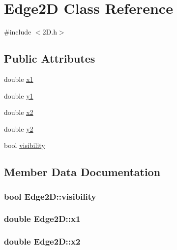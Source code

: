 \hypertarget{class_edge2_d}{}\section{Edge2D Class Reference}
\label{class_edge2_d}


{\ttfamily \#include $<$2\+D.\+h$>$}

\subsection*{Public Attributes}
\begin{DoxyCompactItemize}
\item 
double \hyperlink{class_edge2_d_a57d2011d8b0354061fee41fb14be62d1}{x1}
\item 
double \hyperlink{class_edge2_d_a0d93b3f558f7faa717389bd3208f5f67}{y1}
\item 
double \hyperlink{class_edge2_d_a853c4e716c4f158078d6ec0dcd926c2d}{x2}
\item 
double \hyperlink{class_edge2_d_a9d8863dcde07985fe52d9ed3a8d80b4d}{y2}
\item 
bool \hyperlink{class_edge2_d_a3ab762524c7e0dc8b77beb80a3711544}{visibility}
\end{DoxyCompactItemize}


\subsection{Member Data Documentation}
\subsubsection[{\texorpdfstring{visibility}{visibility}}]{\setlength{\rightskip}{0pt plus 5cm}bool Edge2\+D\+::visibility}\hypertarget{class_edge2_d_a3ab762524c7e0dc8b77beb80a3711544}{}\label{class_edge2_d_a3ab762524c7e0dc8b77beb80a3711544}
\subsubsection[{\texorpdfstring{x1}{x1}}]{\setlength{\rightskip}{0pt plus 5cm}double Edge2\+D\+::x1}\hypertarget{class_edge2_d_a57d2011d8b0354061fee41fb14be62d1}{}\label{class_edge2_d_a57d2011d8b0354061fee41fb14be62d1}
\subsubsection[{\texorpdfstring{x2}{x2}}]{\setlength{\rightskip}{0pt plus 5cm}double Edge2\+D\+::x2}\hypertarget{class_edge2_d_a853c4e716c4f158078d6ec0dcd926c2d}{}\label{class_edge2_d_a853c4e716c4f158078d6ec0dcd926c2d}
